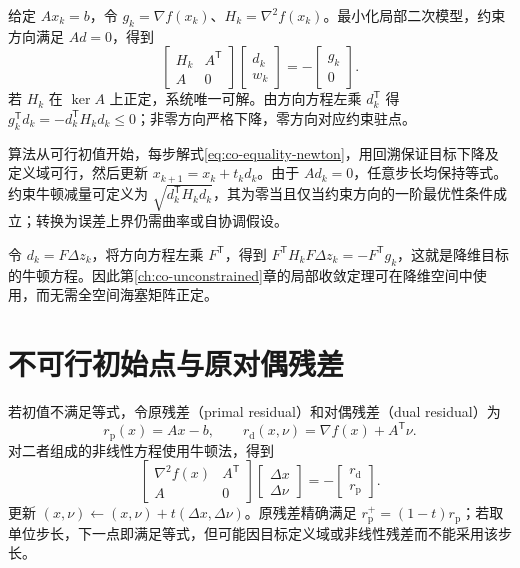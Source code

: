 \documentclass[UTF8,12pt,a4paper,fontset=fandol]{ctexbook}
\begin{document}
给定 $Ax_k=b$，令 $g_k=\nabla f(x_k)$、$H_k=\nabla^2f(x_k)$。最小化局部二次模型，约束方向满足 $Ad=0$，得到
\begin{equation}
 \begin{bmatrix}H_k&A^{\mathsf T}\\A&0\end{bmatrix}
 \begin{bmatrix}d_k\\w_k\end{bmatrix}
 =-\begin{bmatrix}g_k\\0\end{bmatrix}.
 \label{eq:co-equality-newton}
\end{equation}
若 $H_k$ 在 $\ker A$ 上正定，系统唯一可解。由方向方程左乘 $d_k^{\mathsf T}$ 得 $g_k^{\mathsf T}d_k=-d_k^{\mathsf T}H_kd_k\leq0$；非零方向严格下降，零方向对应约束驻点。

算法从可行初值开始，每步解式\eqref{eq:co-equality-newton}，用回溯保证目标下降及定义域可行，然后更新 $x_{k+1}=x_k+t_kd_k$。由于 $Ad_k=0$，任意步长均保持等式。约束牛顿减量可定义为 $\sqrt{d_k^{\mathsf T}H_kd_k}$，其为零当且仅当约束方向的一阶最优性条件成立；转换为误差上界仍需曲率或自协调假设。

令 $d_k=F\Delta z_k$，将方向方程左乘 $F^{\mathsf T}$，得到 $F^{\mathsf T}H_kF\Delta z_k=-F^{\mathsf T}g_k$，这就是降维目标的牛顿方程。因此第\ref{ch:co-unconstrained}章的局部收敛定理可在降维空间中使用，而无需全空间海塞矩阵正定。

\section{不可行初始点与原对偶残差}

若初值不满足等式，令原残差（primal residual）和对偶残差（dual residual）为
\[
 r_{\mathrm p}(x)=Ax-b,\qquad
 r_{\mathrm d}(x,\nu)=\nabla f(x)+A^{\mathsf T}\nu.
\]
对二者组成的非线性方程使用牛顿法，得到
\[
 \begin{bmatrix}\nabla^2f(x)&A^{\mathsf T}\\A&0\end{bmatrix}
 \begin{bmatrix}\Delta x\\\Delta\nu\end{bmatrix}
 =-\begin{bmatrix}r_{\mathrm d}\\r_{\mathrm p}\end{bmatrix}.
\]
更新 $(x,\nu)\leftarrow(x,\nu)+t(\Delta x,\Delta\nu)$。原残差精确满足 $r_{\mathrm p}^{+}=(1-t)r_{\mathrm p}$；若取单位步长，下一点即满足等式，但可能因目标定义域或非线性残差而不能采用该步长。
\end{document}
